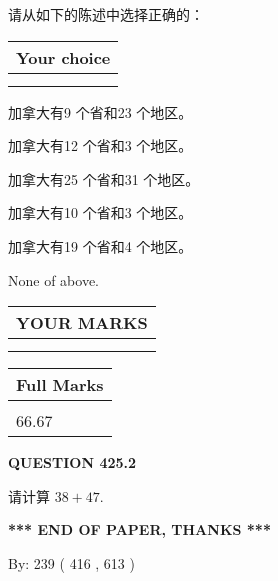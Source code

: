 \documentclass{ctexart}
\begin{document}
  
请从如下的陈述中选择正确的：
  
  
\noindent\hspace{3.0in} \begin{tabular}{|l|}
\hline
Your choice \\
\hline
 \\ 
 \\ 
\hline
\end{tabular}
  
  
 
 
加拿大有9 个省和23 个地区。
 
 
加拿大有12 个省和3 个地区。
 
 
加拿大有25 个省和31 个地区。
 
 
加拿大有10 个省和3 个地区。
 
 
加拿大有19 个省和4 个地区。
 
 
 None of above.
 
 
  
\vspace{0.2in}
  
\noindent\begin{tabular}{|l|}
\hline
 YOUR MARKS  \\
\hline
 \\ 
 \\ 
\hline
\end{tabular}
\hspace{0.05in} \begin{tabular}{|l|}
\hline
 Full Marks  \\
\hline
 \\ 
66.67 \\
\hline
\end{tabular}
{\textbf{\Large{QUESTION
425.2 
}}}
  
  
 
请计算 $ %
38 +  %
47 $.
 

 

 
   
   
 \vspace{0.2in}
 
   
   
   
   
\vspace{1.0in} 
{\textbf{\large{ *** END OF PAPER, THANKS *** }}} 
   
   
\hspace{1.0in} By: 
 239 ( 416 ,  613 )
   
\end{document}
